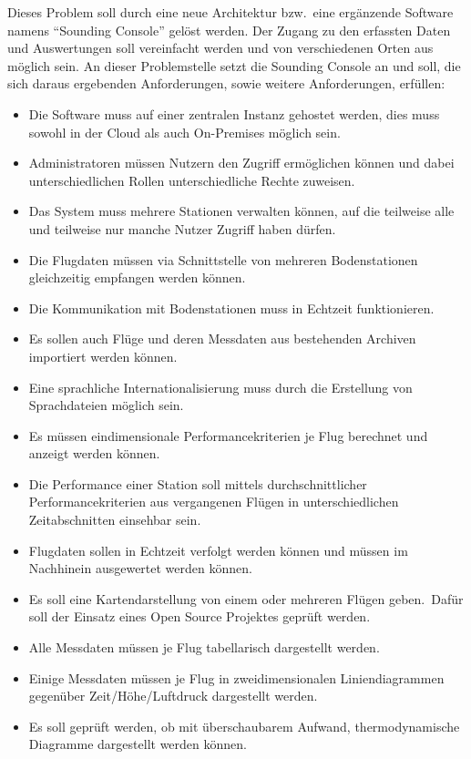 Dieses Problem soll durch eine neue Architektur bzw.\ eine ergänzende Software namens \enquote{Sounding Console} gelöst werden.
Der Zugang zu den erfassten Daten und Auswertungen soll vereinfacht werden und von verschiedenen Orten aus möglich sein.
An dieser Problemstelle setzt die Sounding Console an und soll, die sich daraus ergebenden Anforderungen, sowie weitere Anforderungen, erfüllen:
\begin{itemize}
    \item Die Software muss auf einer zentralen Instanz gehostet werden, dies muss sowohl in der Cloud als auch On-Premises möglich sein.
    \item Administratoren müssen Nutzern den Zugriff ermöglichen können und dabei unterschiedlichen Rollen unterschiedliche Rechte zuweisen.
    \item Das System muss mehrere Stationen verwalten können, auf die teilweise alle und teilweise nur manche Nutzer Zugriff haben dürfen.
    \item Die Flugdaten müssen via Schnittstelle von mehreren Bodenstationen gleichzeitig empfangen werden können.
    \item Die Kommunikation mit Bodenstationen muss in Echtzeit funktionieren.
    \item Es sollen auch Flüge und deren Messdaten aus bestehenden Archiven importiert werden können.
    \item Eine sprachliche Internationalisierung muss durch die Erstellung von Sprachdateien möglich sein.
    \item Es müssen eindimensionale Performancekriterien je Flug berechnet und anzeigt werden können.
    \item Die Performance einer Station soll mittels durchschnittlicher Performancekriterien aus vergangenen Flügen in unterschiedlichen Zeitabschnitten einsehbar sein.
    \item Flugdaten sollen in Echtzeit verfolgt werden können und müssen im Nachhinein ausgewertet werden können.
    \item Es soll eine Kartendarstellung von einem oder mehreren Flügen geben.\ Dafür soll der Einsatz eines Open Source Projektes geprüft werden.
    \item Alle Messdaten müssen je Flug tabellarisch dargestellt werden.
    \item Einige Messdaten müssen je Flug in zweidimensionalen Liniendiagrammen gegenüber Zeit/Höhe/Luftdruck dargestellt werden.
    \item Es soll geprüft werden, ob mit überschaubarem Aufwand, thermodynamische Diagramme dargestellt werden können.
\end{itemize}

